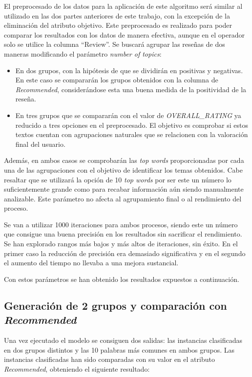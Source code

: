 \documentclass[es]{uc3mreport}
\begin{document}
\begin{report}
El preprocesado de los datos para la aplicación de este algoritmo será similar
al utilizado en las dos partes anteriores de este trabajo, con la excepción de
la eliminación del atributo objetivo. Este preprocesado es realizado para poder
comparar los resultados con los datos de manera efectiva, aunque en el operador
solo se utilice la columna “Review”. Se buscará agrupar las reseñas de dos
maneras modificando el parámetro \textit{number of topics}:

\begin{itemize}
    \item En dos grupos, con la hipótesis de que se dividirán en positivas y
    negativas. En este caso se compararán los grupos obtenidos con la columna
    de \textit{Recommended}, considerándose esta una buena medida de la positividad
    de la reseña.
    \item En tres grupos que se compararán con el valor de \textit{OVERALL\_RATING} ya
    reducido a tres opciones en el preprocesado. El objetivo es comprobar si
    estos textos cuentan con agrupaciones naturales que se relacionen con la
    valoración final del usuario.
\end{itemize}

Además, en ambos casos se comprobarán las \textit{top words} proporcionadas por cada
una de las agrupaciones con el objetivo de identificar los temas obtenidos.
Cabe resaltar que se utilizará la opción de 10 \textit{top words} por ser este un número
lo suficientemente grande como para recabar información aún siendo manualmente
analizable. Este parámetro no afecta al agrupamiento final o al rendimiento del
proceso.

Se van a utilizar 1000 iteraciones para ambos procesos, siendo este un número
que consigue una buena precisión en los resultados sin sacrificar el
rendimiento. Se han explorado rangos más bajos y más altos de iteraciones, sin
éxito. En el primer caso la reducción de precisión era demasiado
significativa y en el segundo el aumento del tiempo no llevaba a una mejora
sustancial.

Con estos parámetros se han obtenido los resultados expuestos a continuación.

\subsection{Generación de 2 grupos y comparación con \textit{Recommended}}
\label{subsec:topicmodelling-recommended}

Una vez ejecutado el modelo se consiguen dos salidas: las instancias
clasificadas en dos grupos distintos y las 10 palabras más comunes en ambos
grupos. Las instancias clasificadas han sido comparadas con su valor en el
atributo \textit{Recommended}, obteniendo el siguiente resultado:


\end{report}
\end{document}
